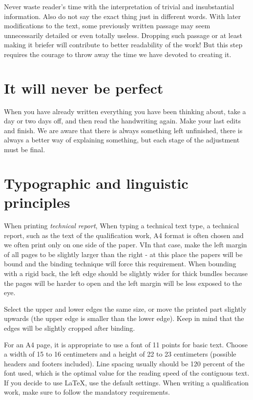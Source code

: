 \documentclass[english,odsaz]{fitthesis}
\begin{document}
Never waste reader's time with the interpretation of trivial and insubstantial
information. Also do not say the exact thing just in different words. With later
modifications to the text, some previously written passage may seem
unnecessarily detailed or even totally useless. Dropping such passage or at
least making it briefer will contribute to better readability of the work! But
this step requires the courage to throw away the time we have devoted to
creating it.

\chapter{It will never be perfect}
\label{sec-3}
When you have already written everything you have been thinking about, take a
day or two days off, and then read the handwriting again. Make your last edits
and finish. We are aware that there is always something left unfinished, there
is always a better way of explaining something, but each stage of the adjustment
must be final.

\chapter{Typographic and linguistic principles}
\label{sec-4}
When printing \emph{technical report}, When typing a technical text type, a
technical report, such as the text of the qualification work, A4 format is often
chosen and we often print only on one side of the paper. VIn that case, make the
left margin of all pages to be slightly larger than the right - at this place
the papers will be bound and the binding technique will force this
requirement. When bounding with a rigid back, the left edge should be slightly
wider for thick bundles because the pages will be harder to open and the left
margin will be less exposed to the eye.

Select the upper and lower edges the same size, or move the printed part
slightly upwards (the upper edge is smaller than the lower edge). Keep in mind
that the edges will be slightly cropped after binding.

For an A4 page, it is appropriate to use a font of 11 points for basic
text. Choose a width of 15 to 16 centimeters and a height of 22 to 23
centimeters (possible headers and footers included). Line spacing usually should
be 120 percent of the font used, which is the optimal value for the reading
speed of the contiguous text. If you decide to use \LaTeX{}, use the default
settings. When writing a qualification work, make sure to follow the mandatory
requirements.
\end{document}
